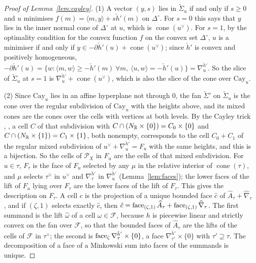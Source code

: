 \begin{proof}[Proof of Lemma~\ref{lem:cayley}]
(1) A vector $(y,s)$ lies in $\widetilde\Sigma_u$ if and only if $s\ge0$ and $u$ minimises $f(m)=\langle
m,y\rangle+s\check h'(m)$ on $\Delta^\circ$. For $s=0$ this says that $y$ lies in the inner normal cone of $\Delta^\circ$
at $u$, which is $\operatorname{cone}(u^\vee)$. For $s=1$, by the optimality condition for the convex function $f$ on the
convex set $\Delta^\circ$, $u$ is a minimiser if and only if $y\in-\partial\check h'(u)+\operatorname{cone}(u^\vee)$;
since $\check h'$ is convex and positively homogeneous, $-\partial\check h'(u)=\{w:\langle m,w\rangle\ge-\check h'(m)\
\forall m,\ \langle u,w\rangle=-\check h'(u)\}=\nabla^{\check h'}_u$. So the slice of $\widetilde\Sigma_u$ at $s=1$ is
$\nabla^{\check h'}_u+\operatorname{cone}(u^\vee)$, which is also the slice of the cone over $\mathrm{Cay}_u$.

(2) Since $\mathrm{Cay}_u$ lies in an affine hyperplane not through $0$, the fan $\widetilde\Sigma'$ on $\widetilde\Sigma_u$
is the cone over the regular subdivision of $\mathrm{Cay}_u$ with the heights above, and its mixed cones are the cones over
the cells with vertices at both levels. By the Cayley trick \cite{HRS}, \cite[\S9.2]{DLRS}, a cell $C$ of that subdivision
with $C\cap(N_\mathbb R\times\{0\})=C_0\times\{0\}$ and $C\cap(N_\mathbb R\times\{1\})=C_1\times\{1\}$, both nonempty, corresponds to the
cell $C_0+C_1$ of the regular mixed subdivision of $u^\vee+\nabla^{\check h'}_u=F_u$ with the same heights, and this is a
bijection. So the cells of $\mathscr P_X$ in $F_u$ are the cells of that mixed subdivision. For $u\in\tau$, $F_\tau$ is
the face of $F_u$ selected by any $\mu$ in the relative interior of $\operatorname{cone}(\tau)$, and $\mu$ selects
$\tau^\vee$ in $u^\vee$ and $\nabla^{\check h'}_\tau$ in $\nabla^{\check h'}_u$ (Lemma~\ref{lem:faces}); the lower faces
of the lift of $F_u$ lying over $F_\tau$ are the lower faces of the lift of $F_\tau$. This gives the description on
$F_\tau$. A cell $c$ is the projection of a unique bounded face $\hat c$ of $\widehat A_\tau+\widehat\nabla_\tau$, and if
$(\zeta,1)$ selects exactly $\hat c$, then $\hat c=\operatorname{face}_{(\zeta,1)}\widehat A_\tau+\operatorname{face}_{(\zeta,1)}\widehat\nabla_\tau$.
The first summand is the lift $\hat\omega$ of a cell $\omega\in\mathcal F$, because $h$ is piecewise linear and strictly
convex on the fan over $\mathcal F$, so that the bounded faces of $\widehat A_\tau$ are the lifts of the cells of
$\mathcal F$ in $\tau^\vee$; the second is $\operatorname{face}_\zeta\nabla^{\check h'}_\tau\times\{0\}$, a face
$\nabla^{\check h'}_{\tau'}\times\{0\}$ with $\tau'\supseteq\tau$. The decomposition of a face of a Minkowski sum into
faces of the summands is unique.
\end{proof}

